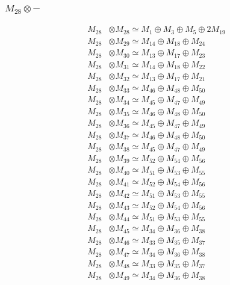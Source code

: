 \subsubsection{$ M_{28}\otimes -$}
\begin{align*}
M_{28} &\otimes M_{28} \simeq M_{1} \oplus M_{3} \oplus M_{5} \oplus 2M_{19} \\
M_{28} &\otimes M_{29} \simeq M_{14} \oplus M_{18} \oplus M_{24} \\
M_{28} &\otimes M_{30} \simeq M_{13} \oplus M_{17} \oplus M_{23} \\
M_{28} &\otimes M_{31} \simeq M_{14} \oplus M_{18} \oplus M_{22} \\
M_{28} &\otimes M_{32} \simeq M_{13} \oplus M_{17} \oplus M_{21} \\
M_{28} &\otimes M_{33} \simeq M_{46} \oplus M_{48} \oplus M_{50} \\
M_{28} &\otimes M_{34} \simeq M_{45} \oplus M_{47} \oplus M_{49} \\
M_{28} &\otimes M_{35} \simeq M_{46} \oplus M_{48} \oplus M_{50} \\
M_{28} &\otimes M_{36} \simeq M_{45} \oplus M_{47} \oplus M_{49} \\
M_{28} &\otimes M_{37} \simeq M_{46} \oplus M_{48} \oplus M_{50} \\
M_{28} &\otimes M_{38} \simeq M_{45} \oplus M_{47} \oplus M_{49} \\
M_{28} &\otimes M_{39} \simeq M_{52} \oplus M_{54} \oplus M_{56} \\
M_{28} &\otimes M_{40} \simeq M_{51} \oplus M_{53} \oplus M_{55} \\
M_{28} &\otimes M_{41} \simeq M_{52} \oplus M_{54} \oplus M_{56} \\
M_{28} &\otimes M_{42} \simeq M_{51} \oplus M_{53} \oplus M_{55} \\
M_{28} &\otimes M_{43} \simeq M_{52} \oplus M_{54} \oplus M_{56} \\
M_{28} &\otimes M_{44} \simeq M_{51} \oplus M_{53} \oplus M_{55} \\
M_{28} &\otimes M_{45} \simeq M_{34} \oplus M_{36} \oplus M_{38} \\
M_{28} &\otimes M_{46} \simeq M_{33} \oplus M_{35} \oplus M_{37} \\
M_{28} &\otimes M_{47} \simeq M_{34} \oplus M_{36} \oplus M_{38} \\
M_{28} &\otimes M_{48} \simeq M_{33} \oplus M_{35} \oplus M_{37} \\
M_{28} &\otimes M_{49} \simeq M_{34} \oplus M_{36} \oplus M_{38} \\

\end{align*}
